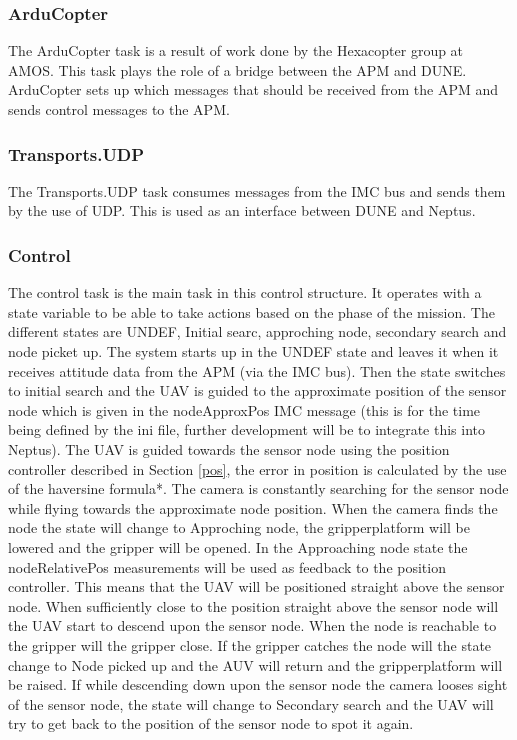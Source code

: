 \subsubsection*{ArduCopter}
The ArduCopter task is a result of work done by the Hexacopter group at AMOS. This task plays the role of a bridge between the APM and DUNE. ArduCopter sets up which messages that should be received from the APM and sends control messages to the APM.
\subsubsection*{Transports.UDP}
The Transports.UDP task consumes messages from the IMC bus and sends them by the use of UDP. This is used as an interface between DUNE and Neptus.
\subsubsection*{Control}
The control task is the main task in this control structure. It operates with a state variable to be able to take actions based on the phase of the mission. The different states are UNDEF, Initial searc, approching node, secondary search and node picket up. The system starts up in the UNDEF state and leaves it when it receives attitude data from the APM (via the IMC bus). Then the state switches to initial search and the UAV is guided to the approximate position of the sensor node which is given in the nodeApproxPos IMC message (this is for the time being defined by the ini file, further development will be to integrate this into Neptus). The UAV is guided towards the sensor node using the position controller described in Section \ref{pos}, the error in position is calculated by the use of  the haversine formula*. The camera is constantly searching for the sensor node while flying towards the approximate node position. When the camera finds the node the state will change to Approching node, the gripperplatform will be lowered and the gripper will be opened. In the Approaching node state the nodeRelativePos measurements will be used as feedback to the position controller. This means that the UAV will be positioned straight above the sensor node. When sufficiently close to the position straight above the sensor node will the UAV start to descend upon the sensor node. When the node is reachable to the gripper will the gripper close. If the gripper catches the node will the state change to Node picked up and the AUV will return and the gripperplatform will be raised. If while descending down upon the sensor node the camera looses sight of the sensor node, the state will change to Secondary search and the UAV will try to get back to the position of the sensor node to spot it again.
